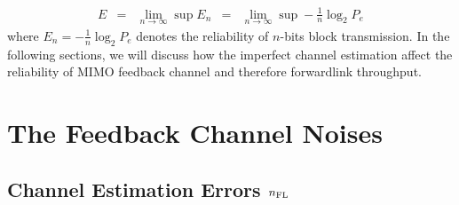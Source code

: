 \documentclass[10pt,fleqn, twocolumn]{IEEEtran}
\begin{document}
\begin{equation}
\begin{array}{rcccl}
E&=&\lim\limits_{n\rightarrow\infty}\sup
E_{n}&=&\lim\limits_{n\rightarrow\infty}\sup-\frac{1}{n}\log_{2}P_{e}
\end{array}
\end{equation}
\noindent where $E_{n}=-\frac{1}{n}\log_{2}P_{e}$ denotes the
reliability of $n$-bits block transmission. In the following
sections, we will discuss how the imperfect channel estimation
affect the reliability of MIMO feedback channel and therefore
forwardlink throughput.

\section{The Feedback Channel Noises}

\subsection{Channel Estimation Errors $n_{\rm FL}$}
\end{document}
